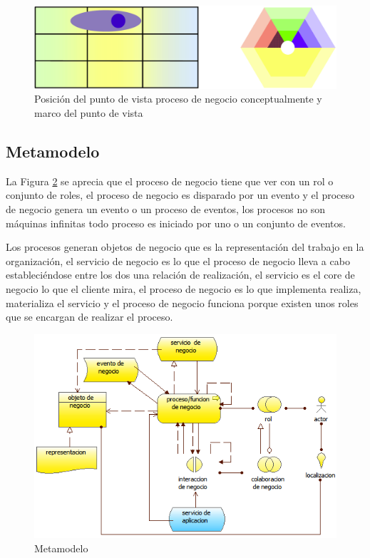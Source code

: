       \begin{figure}[h]
      	\centering
      	\includegraphics[scale=0.2]{Imagenes/Figuras/17}
      	\caption{Posición del punto de vista proceso de negocio conceptualmente y marco del punto de vista \cite{ref9}}
      	\label{figura17}
      \end{figure}

      \subsection{Metamodelo}
      La Figura \ref{metamodelo4} se aprecia que el proceso de negocio tiene que ver con un rol o conjunto de roles, el proceso de negocio es disparado por un evento y el proceso de negocio genera un evento o un proceso de eventos, los procesos no son máquinas infinitas todo proceso es
      iniciado por uno o un conjunto de eventos.

      Los procesos generan objetos de negocio que es la representación del trabajo en la organización,  el servicio de negocio es lo que el proceso de negocio lleva a cabo estableciéndose entre los dos una relación de realización, el servicio es el core de negocio lo que el cliente mira, el proceso de negocio es lo que implementa realiza, materializa el servicio y el proceso de negocio funciona porque existen unos roles que se encargan de realizar el proceso. \cite{ref9}

      \begin{figure}[h]
      	\centering
      	\includegraphics{Imagenes/Metamodelos/04.png}
      	\caption{Metamodelo}
      	\label{metamodelo4}
      \end{figure}

